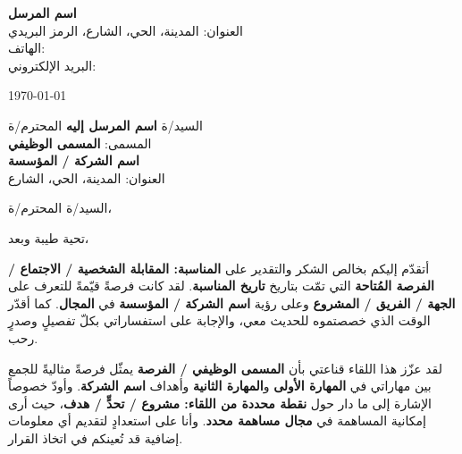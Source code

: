\documentclass[12pt,a4paper]{article}
\begin{document}
\begin{flushright}
{\large\bfseries اسم المرسل}\\[0.2em]
العنوان: المدينة، الحي، الشارع، الرمز البريدي\\[0.2em]
الهاتف: \\[0.2em]
البريد الإلكتروني: 
\end{flushright}

\vspace{1em}

\begin{flushright}
\today
\end{flushright}

\vspace{1em}

\begin{flushright}
السيد/ة \textbf{اسم المرسل إليه} المحترم/ة\\[0.2em]
المسمى: \textbf{المسمى الوظيفي}\\[0.2em]
\textbf{اسم الشركة / المؤسسة}\\[0.2em]
العنوان: المدينة، الحي، الشارع
\end{flushright}

\vspace{1em}

\begin{flushright}
السيد/ة المحترم/ة،
\end{flushright}

\vspace{0.5em}

تحية طيبة وبعد،

أتقدّم إليكم بخالص الشكر والتقدير على \textbf{المناسبة: المقابلة الشخصية / الاجتماع / الفرصة المُتاحة} التي تمّت بتاريخ \textbf{تاريخ المناسبة}. لقد كانت فرصةً قيّمةً للتعرف على \textbf{الجهة / الفريق / المشروع} وعلى رؤية \textbf{اسم الشركة / المؤسسة} في \textbf{المجال}. كما أقدّر الوقت الذي خصصتموه للحديث معي، والإجابة على استفساراتي بكلّ تفصيلٍ وصدرٍ رحب.

لقد عزّز هذا اللقاء قناعتي بأن \textbf{المسمى الوظيفي / الفرصة} يمثّل فرصةً مثاليةً للجمع بين مهاراتي في \textbf{المهارة الأولى} و\textbf{المهارة الثانية} وأهداف \textbf{اسم الشركة}. وأودّ خصوصاً الإشارة إلى ما دار حول \textbf{نقطة محددة من اللقاء: مشروع / تحدٍّ / هدف}، حيث أرى إمكانية المساهمة في \textbf{مجال مساهمة محدد}. وأنا على استعدادٍ لتقديم أي معلومات إضافية قد تُعينكم في اتخاذ القرار.
\end{document}
